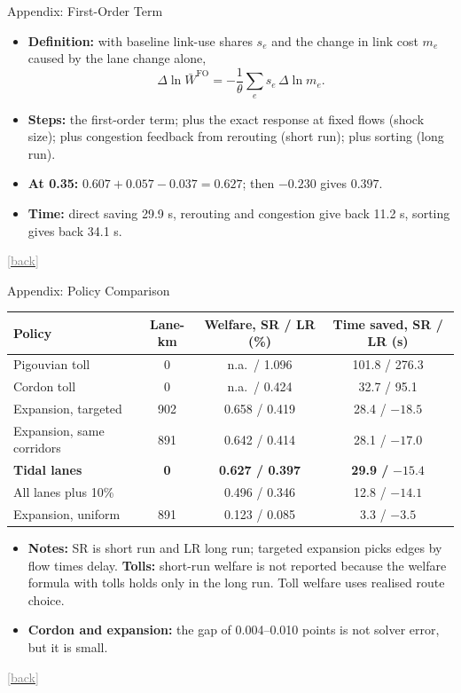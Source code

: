 \documentclass[11pt,aspectratio=169]{beamer}
\newcommand{\lead}[1]{{\color{Navy}\textbf{#1}}}
\newcommand{\backto}[1]{\par\vfill\hfill\hyperlink{#1}{\textcolor{gray}{\scriptsize[back]}}}
\begin{document}
\begin{frame}[label=a-fo]{Appendix: First-Order Term}
\footnotesize
\begin{itemize}
\item \lead{Definition:} with baseline link-use shares $s_e$ and the change in link cost $m_e$ caused by the lane change alone,
\[
\Delta\ln\bar W^{\text{FO}}=-\frac{1}{\theta}\sum_e s_e\,\Delta\ln m_e .
\]
\item \lead{Steps:} the first-order term; plus the exact response at fixed flows (shock size); plus congestion feedback from rerouting (short run); plus sorting (long run).
\item \lead{At 0.35:} $0.607+0.057-0.037=0.627$; then $-0.230$ gives $0.397$.
\item \lead{Time:} direct saving 29.9 s, rerouting and congestion give back 11.2 s, sorting gives back 34.1 s.
\end{itemize}
\backto{m-decomp}
\end{frame}

\begin{frame}[label=a-policy]{Appendix: Policy Comparison}
\footnotesize
\centering
\renewcommand{\arraystretch}{1.2}
\begin{tabular}{@{}lccc@{}}
\toprule
Policy & Lane-km & Welfare, SR / LR (\%) & Time saved, SR / LR (s)\\\midrule
Pigouvian toll & 0 & n.a.\ / 1.096 & 101.8 / 276.3\\
Cordon toll & 0 & n.a.\ / 0.424 & 32.7 / 95.1\\
Expansion, targeted & 902 & 0.658 / 0.419 & 28.4 / $-18.5$\\
Expansion, same corridors & 891 & 0.642 / 0.414 & 28.1 / $-17.0$\\
\textbf{Tidal lanes} & \textbf{0} & \textbf{0.627 / 0.397} & \textbf{29.9 /} $\mathbf{-15.4}$\\
All lanes plus 10\% & & 0.496 / 0.346 & 12.8 / $-14.1$\\
Expansion, uniform & 891 & 0.123 / 0.085 & 3.3 / $-3.5$\\
\bottomrule
\end{tabular}
\par\medskip\raggedright
\begin{itemize}
\item \lead{Notes:} SR is short run and LR long run; targeted expansion picks edges by flow times delay. \lead{Tolls:} short-run welfare is not reported because the welfare formula with tolls holds only in the long run. Toll welfare uses realised route choice.
\item \lead{Cordon and expansion:} the gap of 0.004--0.010 points is not solver error, but it is small.
\end{itemize}
\backto{m-policy}
\end{frame}
\end{document}
